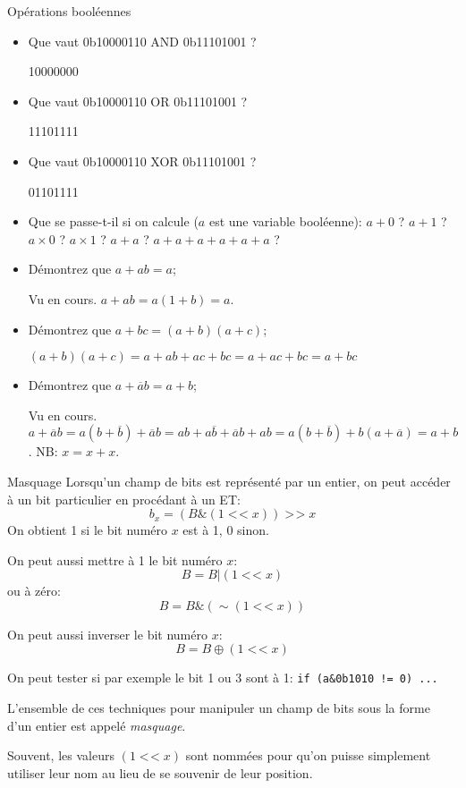 \begin{exercice}
  \begin{exercicelet}{Opérations booléennes}
    \begin{itemize}
    \item Que vaut 0b10000110 AND 0b11101001 ?
      \begin{correction}10000000\end{correction}
    \item Que vaut 0b10000110 OR 0b11101001 ?
      \begin{correction}11101111\end{correction}
    \item Que vaut 0b10000110 XOR 0b11101001 ?
      \begin{correction}01101111\end{correction}
    \item Que se passe-t-il si on calcule ($a$ est une variable booléenne):
      $a+0$ ? $a+1$ ? $a\times 0$ ? $a\times 1$ ? $a+a$ ? $a+a+a+a+a+a$ ?
    \item Démontrez que $a+ab=a$;
      \begin{correction}Vu en cours. $a+ab=a(1+b)=a$.\end{correction}
    \item Démontrez que $a+bc=(a+b)(a+c)$;
      \begin{correction}
        $(a+b)(a+c)=a+ab+ac+bc=a+ac+bc=a+bc$
      \end{correction}
    \item Démontrez que $a+\overline{a}b=a+b$;
      \begin{correction}Vu en
        cours. $a+\overline{a}b=a(b+\overline{b})+\overline{a}b=ab+a\overline{b}+
        \overline{a}b+ab=a(b+\overline{b})+b(a+\overline{a})=a+b$. NB:
        $x=x+x$.\end{correction}
    \end{itemize}
  \end{exercicelet}
\end{exercice}
\begin{frame}{Masquage}
  Lorsqu'un champ de bits est représenté par un entier, on peut accéder à un
  bit particulier en procédant à un ET:
  $$b_x=(B\&(1\mathop{<\!<}x))\mathop{>\!>}x$$
  On obtient 1 si le bit numéro $x$ est à 1, 0 sinon.
  
  On peut aussi mettre à 1 le bit numéro $x$:
  $$B=B|(1\mathop{<\!<}x)$$
  ou à zéro:
  $$B=B\&(\sim(1\mathop{<\!<}x))$$

  On peut aussi inverser le bit numéro $x$:
  $$B=B\oplus(1\mathop{<\!<}x)$$

  On peut tester si par exemple le bit 1 ou 3 sont à 1: \texttt{if (a\&0b1010
    != 0) ...}

  L'ensemble de ces techniques pour manipuler un champ de bits sous la forme
  d'un entier est appelé \emph{masquage}.
  
  Souvent, les valeurs $(1\mathop{<\!<}x)$ sont nommées pour qu'on puisse
  simplement utiliser leur nom au lieu de se souvenir de leur position.
\end{frame}
